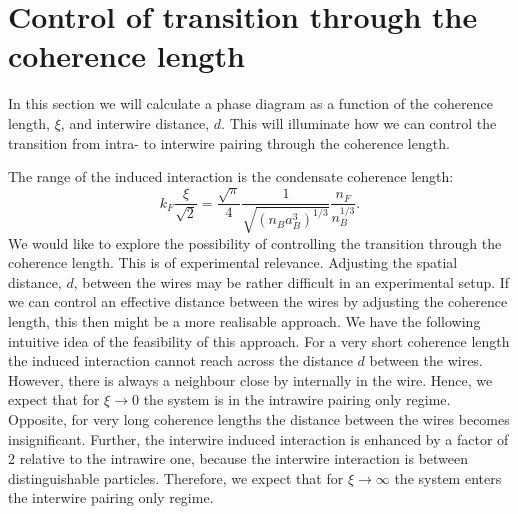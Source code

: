 \section{Control of transition through the coherence length}
\label{sec.2wires_crossover_control_coherence_length}
In this section we will calculate a phase diagram as a function of the coherence length, $\xi$, and interwire distance, $d$. This will illuminate how we can control the transition from intra- to interwire pairing through the coherence length. 

The range of the induced interaction is the condensate coherence length:
\begin{equation}
k_F\frac{\xi}{\sqrt{2}} = \frac{\sqrt{\pi}}{4}\frac{1}{\sqrt{(n_Ba_B^3)^{1/3}}}\frac{n_F}{n_B^{1/3}}.
\label{eq.RangefunctionofrBBnB}
\end{equation}
We would like to explore the possibility of controlling the transition through the coherence length. This is of experimental relevance. Adjusting the spatial distance, $d$, between the wires may be rather difficult in an experimental setup. If we can control an effective distance between the wires by adjusting the coherence length, this then might be a more realisable approach. We have the following intuitive idea of the feasibility of this approach. For a very short coherence length the induced interaction cannot reach across the distance $d$ between the wires. However, there is always a neighbour close by internally in the wire. Hence, we expect that for $\xi \to 0$ the system is in the intrawire pairing only regime. Opposite, for very long coherence lengths the distance between the wires becomes insignificant. Further, the interwire induced interaction is enhanced by a factor of 2 relative to the intrawire one, because the interwire interaction is between distinguishable particles. Therefore, we expect that for $\xi \to \infty$ the system enters the interwire pairing only regime. 


